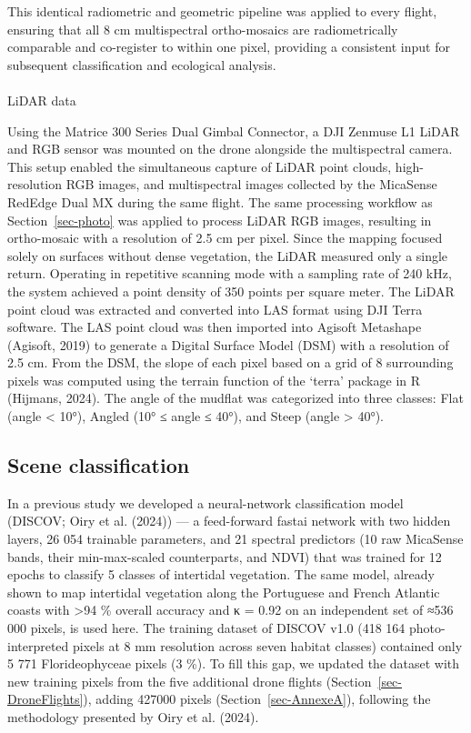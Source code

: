 \documentclass[
  letterpaper,
  DIV=11,
  numbers=noendperiod]{scrartcl}
\makeatletter
\let\oldparagraph\paragraph
\renewcommand{\paragraph}{
    \@ifstar
      \xxxParagraphStar
      \xxxParagraphNoStar
  }
\newcommand{\xxxParagraphStar}[1]{\oldparagraph*{#1}\mbox{}}
\newcommand{\xxxParagraphNoStar}[1]{\oldparagraph{#1}\mbox{}}
\makeatother
\begin{document}
This identical radiometric and geometric pipeline was applied to every
flight, ensuring that all 8 cm multispectral ortho-mosaics are
radiometrically comparable and co-register to within one pixel,
providing a consistent input for subsequent classification and
ecological analysis.

\paragraph{LiDAR data}\label{lidar-data}

Using the Matrice 300 Series Dual Gimbal Connector, a DJI Zenmuse L1
LiDAR and RGB sensor was mounted on the drone alongside the
multispectral camera. This setup enabled the simultaneous capture of
LiDAR point clouds, high-resolution RGB images, and multispectral images
collected by the MicaSense RedEdge Dual MX during the same flight. The
same processing workflow as Section~\ref{sec-photo} was applied to
process LiDAR RGB images, resulting in ortho-mosaic with a resolution of
2.5 cm per pixel. Since the mapping focused solely on surfaces without
dense vegetation, the LiDAR measured only a single return. Operating in
repetitive scanning mode with a sampling rate of 240 kHz, the system
achieved a point density of 350 points per square meter. The LiDAR point
cloud was extracted and converted into LAS format using DJI Terra
software. The LAS point cloud was then imported into Agisoft Metashape
(Agisoft, 2019) to generate a Digital Surface Model (DSM) with a
resolution of 2.5 cm. From the DSM, the slope of each pixel based on a
grid of 8 surrounding pixels was computed using the terrain function of
the `terra' package in R (Hijmans, 2024). The angle of the mudflat was
categorized into three classes: Flat (angle \textless{} 10°), Angled
(10° ≤ angle ≤ 40°), and Steep (angle \textgreater{} 40°).

\subsection{Scene classification}\label{scene-classification}

In a previous study we developed a neural-network classification model
(DISCOV; Oiry et al. (2024)) --- a feed-forward fastai network with two
hidden layers, 26 054 trainable parameters, and 21 spectral predictors
(10 raw MicaSense bands, their min-max-scaled counterparts, and NDVI)
that was trained for 12 epochs to classify 5 classes of intertidal
vegetation. The same model, already shown to map intertidal vegetation
along the Portuguese and French Atlantic coasts with \textgreater94 \%
overall accuracy and κ = 0.92 on an independent set of ≈536 000 pixels,
is used here. The training dataset of DISCOV v1.0 (418 164
photo-interpreted pixels at 8 mm resolution across seven habitat
classes) contained only 5 771 Florideophyceae pixels (3 \%). To fill
this gap, we updated the dataset with new training pixels from the five
additional drone flights (Section~\ref{sec-DroneFlights}), adding 427000
pixels (Section~\ref{sec-AnnexeA}), following the methodology presented
by Oiry et al. (2024).
\end{document}
